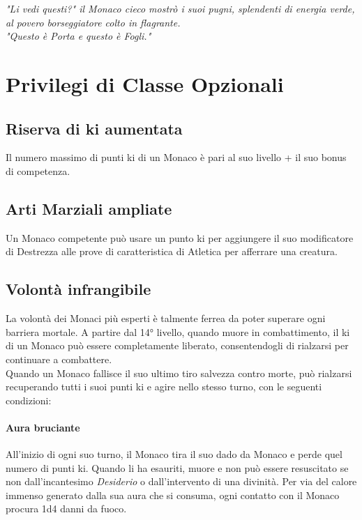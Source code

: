
\begin{DndReadAloud}
  \it
  "Li vedi questi?" il Monaco cieco mostrò i suoi pugni, splendenti di energia verde, al povero borseggiatore colto in flagrante. \\ "Questo è Porta e questo è Fogli."
\end{DndReadAloud}

\section{Privilegi di Classe Opzionali}

\subsection{Riserva di ki aumentata}

Il numero massimo di punti ki di un Monaco è pari al suo livello + il suo bonus di competenza.

\subsection{Arti Marziali ampliate}

Un Monaco competente può usare un punto ki per aggiungere il suo modificatore di Destrezza alle prove di caratteristica di Atletica per afferrare una creatura.

\subsection{Volontà infrangibile}

La volontà dei Monaci più esperti è talmente ferrea da poter superare ogni barriera mortale. A partire dal 14° livello, quando muore in combattimento, il ki di un Monaco può essere completamente liberato, consentendogli di rialzarsi per continuare a combattere.\\ Quando un Monaco fallisce il suo ultimo tiro salvezza contro morte, può rialzarsi recuperando tutti i suoi punti ki e agire nello stesso turno, con le seguenti condizioni: \\
\paragraph{Aura bruciante} All'inizio di ogni suo turno, il Monaco tira il suo dado da Monaco e perde quel numero di punti ki. Quando li ha esauriti, muore e non può essere resuscitato se non dall'incantesimo \textit{Desiderio} o dall'intervento di una divinità. Per via del calore immenso generato dalla sua aura che si consuma, ogni contatto con il Monaco procura 1d4 danni da fuoco.
